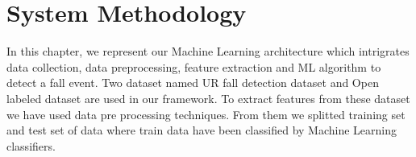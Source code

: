 \chapter{System Methodology}

In this chapter, we represent our Machine Learning architecture which intrigrates data collection, data preprocessing, feature extraction and ML algorithm to detect a fall event. Two dataset named UR fall detection dataset and Open labeled dataset are used in our framework. To extract features from these dataset we have used data pre processing techniques. From them we splitted training set and test set of data where train data have been classified by Machine Learning classifiers.

